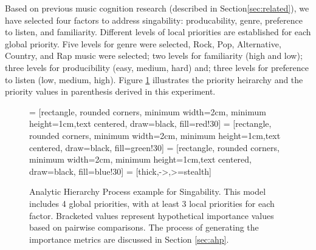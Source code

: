Based on previous music cognition research (described in Section\ref{sec:related}), we have selected four factors to address singability: producability, genre, preference to listen, and familiarity. Different levels of local priorities are established for each global priority. Five levels for genre were selected, Rock, Pop, Alternative, Country, and Rap music were selected; two levels for familiarity (high and low); three levels for producibility (easy, medium, hard) and; three levels for preference to listen (low, medium, high). Figure \ref{fig:ahp} illustrates the priority heirarchy and the priority values in parenthesis derived in this experiment.

\begin{figure}
 = [rectangle, rounded corners, minimum width=2cm, minimum height=1cm,text centered, draw=black, fill=red!30]
 = [rectangle, rounded corners, minimum width=2cm, minimum height=1cm,text centered, draw=black, fill=green!30]
 = [rectangle, rounded corners, minimum width=2cm, minimum height=1cm,text centered, draw=black, fill=blue!30]
 = [thick,->,>=stealth]
\centering
{}
\caption{Analytic Hierarchy Process example for Singability.  This model includes 4 global priorities, with at least 3 local priorities for each factor. Bracketed values represent hypothetical importance values based on pairwise comparisons. The process of generating the importance metrics are discussed in Section \ref{sec:ahp}. \label{fig:ahp}}
\end{figure}

